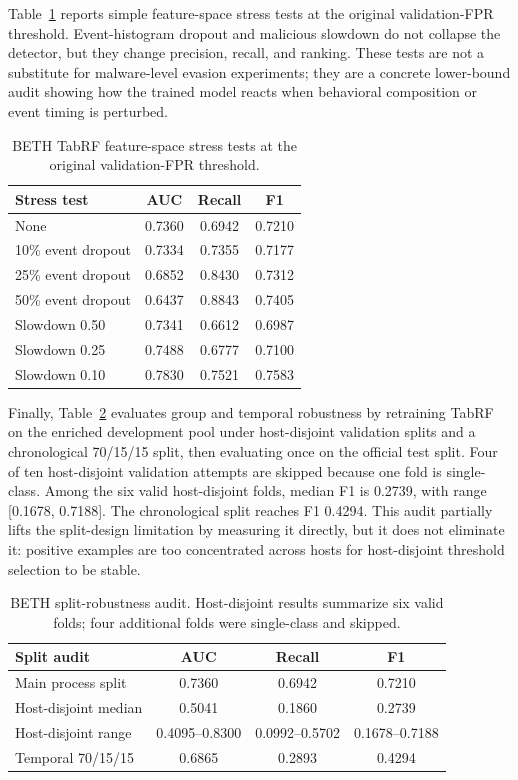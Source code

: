 \documentclass[journal]{IEEEtran}
\begin{document}
Table~\ref{tab:beth_stress} reports simple feature-space stress tests at the original validation-FPR threshold. Event-histogram dropout and malicious slowdown do not collapse the detector, but they change precision, recall, and ranking. These tests are not a substitute for malware-level evasion experiments; they are a concrete lower-bound audit showing how the trained model reacts when behavioral composition or event timing is perturbed.

\begin{table}[t]
\centering
\caption{BETH TabRF feature-space stress tests at the original validation-FPR threshold.}
\label{tab:beth_stress}
\begin{tabular}{lccc}
\toprule
\textbf{Stress test} & \textbf{AUC} & \textbf{Recall} & \textbf{F1} \\
\midrule
None & 0.7360 & 0.6942 & 0.7210 \\
10\% event dropout & 0.7334 & 0.7355 & 0.7177 \\
25\% event dropout & 0.6852 & 0.8430 & 0.7312 \\
50\% event dropout & 0.6437 & 0.8843 & 0.7405 \\
Slowdown 0.50 & 0.7341 & 0.6612 & 0.6987 \\
Slowdown 0.25 & 0.7488 & 0.6777 & 0.7100 \\
Slowdown 0.10 & 0.7830 & 0.7521 & 0.7583 \\
\bottomrule
\end{tabular}
\end{table}

Finally, Table~\ref{tab:beth_group_temporal} evaluates group and temporal robustness by retraining TabRF on the enriched development pool under host-disjoint validation splits and a chronological 70/15/15 split, then evaluating once on the official test split. Four of ten host-disjoint validation attempts are skipped because one fold is single-class. Among the six valid host-disjoint folds, median F1 is 0.2739, with range [0.1678, 0.7188]. The chronological split reaches F1 0.4294. This audit partially lifts the split-design limitation by measuring it directly, but it does not eliminate it: positive examples are too concentrated across hosts for host-disjoint threshold selection to be stable.

\begin{table}[t]
\centering
\caption{BETH split-robustness audit. Host-disjoint results summarize six valid folds; four additional folds were single-class and skipped.}
\label{tab:beth_group_temporal}
\begin{tabular}{lccc}
\toprule
\textbf{Split audit} & \textbf{AUC} & \textbf{Recall} & \textbf{F1} \\
\midrule
Main process split & 0.7360 & 0.6942 & 0.7210 \\
Host-disjoint median & 0.5041 & 0.1860 & 0.2739 \\
Host-disjoint range & 0.4095--0.8300 & 0.0992--0.5702 & 0.1678--0.7188 \\
Temporal 70/15/15 & 0.6865 & 0.2893 & 0.4294 \\
\bottomrule
\end{tabular}
\end{table}
\end{document}
